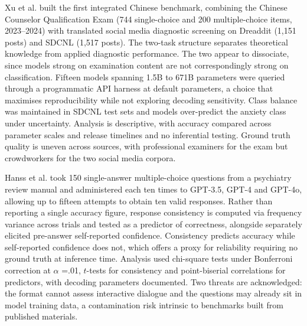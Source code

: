 \documentclass[11pt]{article}
\begin{document}
	Xu et al.\cite{Xu2025} built the first integrated Chinese benchmark, combining the Chinese Counselor Qualification Exam (744 single-choice and 200 multiple-choice items, 2023--2024) with translated social media diagnostic screening on Dreaddit (1,151 posts) and SDCNL (1,517 posts). The two-task structure separates theoretical knowledge from applied diagnostic performance. The two appear to dissociate, since models strong on examination content are not correspondingly strong on classification. Fifteen models spanning 1.5B to 671B parameters were queried through a programmatic API harness at default parameters, a choice that maximises reproducibility while not exploring decoding sensitivity. Class balance was maintained in SDCNL test sets and models over-predict the anxiety class under uncertainty. Analysis is descriptive, with accuracy compared across parameter scales and release timelines and no inferential testing. Ground truth quality is uneven across sources, with professional examiners for the exam but crowdworkers for the two social media corpora.
	
	Hanss et al.\cite{Hanss2025} took 150 single-answer multiple-choice questions from a psychiatry review manual and administered each ten times to GPT-3.5, GPT-4 and GPT-4o, allowing up to fifteen attempts to obtain ten valid responses. Rather than reporting a single accuracy figure, response consistency is computed via frequency variance across trials and tested as a predictor of correctness, alongside separately elicited pre-answer self-reported confidence. Consistency predicts accuracy while self-reported confidence does not, which offers a proxy for reliability requiring no ground truth at inference time. Analysis used chi-square tests under Bonferroni correction at $\alpha$ =.01, $t$-tests for consistency and point-biserial correlations for predictors, with decoding parameters documented. Two threats are acknowledged: the format cannot assess interactive dialogue and the questions may already sit in model training data, a contamination risk intrinsic to benchmarks built from published materials.
	
\end{document}
